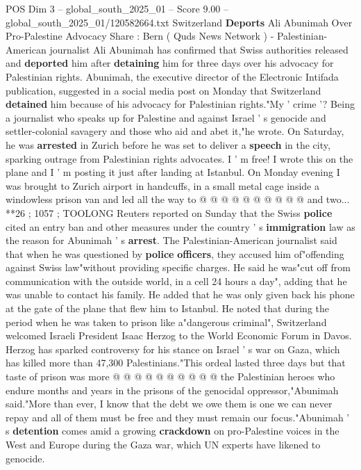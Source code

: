 \begin{textsample}{POS Dim 3 – global\_south\_2025\_01 – Score 9.00 – global\_south\_2025\_01/120582664.txt}  \label{ex:f3_pos_383}
Switzerland \textbf{Deports} Ali Abunimah Over Pro-Palestine Advocacy Share : Bern ( Quds News Network ) - Palestinian-American journalist Ali Abunimah has confirmed that Swiss authorities released and \textbf{deported} him after \textbf{detaining} him for three days over his advocacy for Palestinian rights.
Abunimah, the executive director of the Electronic Intifada publication, suggested in a social media post on Monday that Switzerland \textbf{detained} him because of his advocacy for Palestinian rights."My ' crime '?
Being a journalist who speaks up for Palestine and against Israel ' s genocide and settler-colonial savagery and those who aid and abet it,"he wrote.
On Saturday, he was \textbf{arrested} in Zurich before he was set to deliver a \textbf{speech} in the city, sparking outrage from Palestinian rights advocates.
I ' m free!
I wrote this on the plane and I ' m posting it just after landing at Istanbul.
On Monday evening I was brought to Zurich airport in handcuffs, in a small metal cage inside a windowless prison van and led all the way to @ @ @ @ @ @ @ @ @ @ and two... **26 ; 1057 ; TOOLONG Reuters reported on Sunday that the Swiss \textbf{police} cited an entry ban and other measures under the country ' s \textbf{immigration} law as the reason for Abunimah ' s \textbf{arrest}.
The Palestinian-American journalist said that when he was questioned by \textbf{police} \textbf{officers}, they accused him of"offending against Swiss law"without providing specific charges.
He said he was"cut off from communication with the outside world, in a cell 24 hours a day", adding that he was unable to contact his family.
He added that he was only given back his phone at the gate of the plane that flew him to Istanbul.
He noted that during the period when he was taken to prison like a"dangerous criminal", Switzerland welcomed Israeli President Isaac Herzog to the World Economic Forum in Davos.
Herzog has sparked controversy for his stance on Israel ' s war on Gaza, which has killed more than 47,300 Palestinians."This ordeal lasted three days but that taste of prison was more @ @ @ @ @ @ @ @ @ @ the Palestinian heroes who endure months and years in the prisons of the genocidal oppressor,"Abunimah said."More than ever, I know that the debt we owe them is one we can never repay and all of them must be free and they must remain our focus."Abunimah ' s \textbf{detention} comes amid a growing \textbf{crackdown} on pro-Palestine voices in the West and Europe during the Gaza war, which UN experts have likened to genocide.

\end{textsample}
